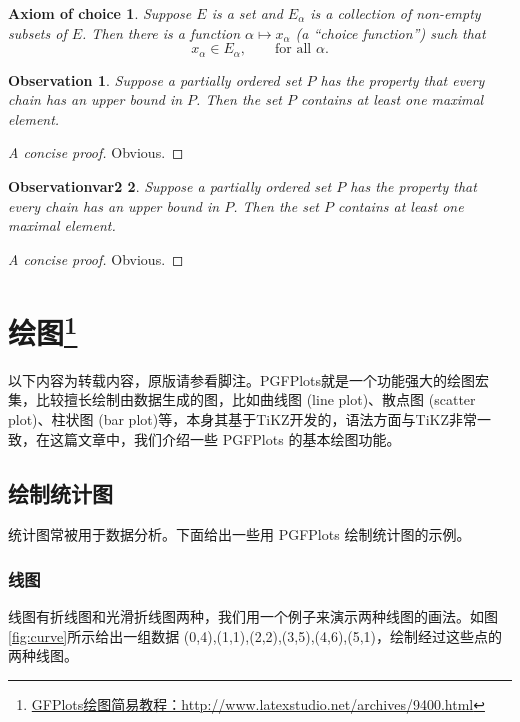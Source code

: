 \newtheorem*{axiomofchoice}{Axiom of choice}
\begin{axiomofchoice}
	Suppose $E$ is a set and ${E_\alpha}$ is a collection of
	non-empty subsets of $E$. Then there is a function $\alpha
	\mapsto x_\alpha$ (a ``choice function'') such that
	\begin{equation}
	x_\alpha \in E_\alpha,\qquad \text{for all }\alpha.
	\end{equation}
\end{axiomofchoice}

\newtheorem{observation}{Observation}[chapter]
\begin{observation}
	Suppose a partially ordered set $P$ has the property
	that every chain has an upper bound in $P$. Then the
	set $P$ contains at least one maximal element.
\end{observation}
\begin{proof}[A concise proof]
	Obvious.
\end{proof}

\newtheorem{observationvar2}[observation]{Observationvar2}
\begin{observationvar2}
	Suppose a partially ordered set $P$ has the property
	that every chain has an upper bound in $P$. Then the
	set $P$ contains at least one maximal element.
\end{observationvar2}
\begin{proof}[A concise proof]
	Obvious.
\end{proof}

\section{绘图\footnote{\href{http://www.latexstudio.net/archives/9400.html}{GFPlots绘图简易教程：http://www.latexstudio.net/archives/9400.html}}}

以下内容为转载内容，原版请参看脚注。PGFPlots就是一个功能强大的绘图宏集，比较擅长绘制由数据生成的图，比如曲线图 (line plot)、散点图 (scatter plot)、柱状图 (bar plot)等，本身其基于TiKZ开发的，语法方面与TiKZ非常一致，在这篇文章中，我们介绍一些 PGFPlots 的基本绘图功能。

\subsection{绘制统计图}
统计图常被用于数据分析。下面给出一些用 PGFPlots 绘制统计图的示例。

\subsubsection{线图}
线图有折线图和光滑折线图两种，我们用一个例子来演示两种线图的画法。如图\ref{fig:curve}所示给出一组数据 {(0,4),(1,1),(2,2),(3,5),(4,6),(5,1)}，绘制经过这些点的两种线图。

